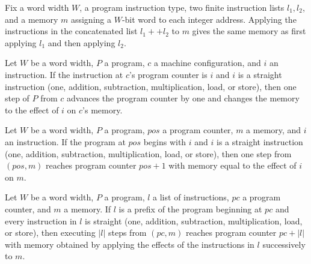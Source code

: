 \begin{theorem}
\label{WordRAM.effects_append}
\leanok
{}
Fix a word width $W$, a program instruction type, two finite instruction lists
$l_1,l_2$, and a memory $m$ assigning a $W$-bit word to each integer address. Applying
the instructions in the concatenated list $l_1 ++ l_2$ to $m$ gives the same memory as
first applying $l_1$ and then applying $l_2$.
\end{theorem}

\begin{theorem}
\label{WordRAM.step_straight}
\leanok
{}
Let $W$ be a word width, $P$ a program, $c$ a machine configuration, and $i$ an
instruction. If the instruction at $c$'s program counter is $i$ and $i$ is a straight
instruction (one, addition, subtraction, multiplication, load, or store), then one step
of $P$ from $c$ advances the program counter by one and changes the memory to the effect
of $i$ on $c$'s memory.
\end{theorem}

\begin{theorem}
\label{WordRAM.steps_instr}
\leanok
{}
Let $W$ be a word width, $P$ a program, $pos$ a program counter, $m$ a memory, and $i$
an instruction. If the program at $pos$ begins with $i$ and $i$ is a straight
instruction (one, addition, subtraction, multiplication, load, or store), then one step
from $(pos,m)$ reaches program counter $pos+1$ with memory equal to the effect of $i$ on
$m$.
\end{theorem}

\begin{theorem}
\label{WordRAM.steps_straight}
\leanok
{}
Let $W$ be a word width, $P$ a program, $l$ a list of instructions, $pc$ a program
counter, and $m$ a memory. If $l$ is a prefix of the program beginning at $pc$ and every
instruction in $l$ is straight (one, addition, subtraction, multiplication, load, or
store), then executing $|l|$ steps from $(pc,m)$ reaches program counter $pc+|l|$ with
memory obtained by applying the effects of the instructions in $l$ successively to $m$.
\end{theorem}

